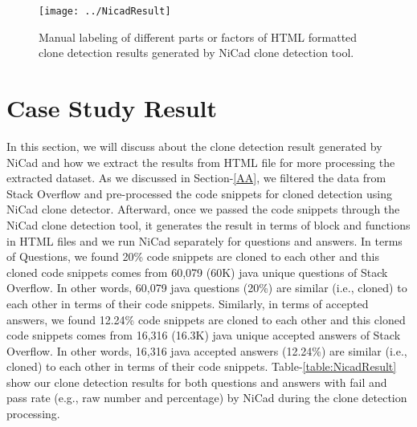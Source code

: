 \documentclass[conference]{IEEEtran}
\begin{document}
	\begin{figure*}[ht]
		\centering
		\texttt{[image: ../NicadResult]}
		\caption{Manual labeling of different parts or factors of HTML formatted clone detection results generated by NiCad clone detection tool. }
		\label{fig:nicadCloningresult}
	\end{figure*}
	
	\section{Case Study Result }\label{CDPR}
	 In this section, we will discuss about the clone detection result generated by NiCad and how we extract the results from HTML file for more processing the extracted dataset.  As we discussed in Section-\ref{AA}, we filtered the data from Stack Overflow and pre-processed the code snippets for cloned detection using NiCad clone detector. Afterward, once we passed the code snippets through the NiCad clone detection tool, it generates the result in terms of block and functions in HTML files and we run NiCad separately for questions and answers. In terms of Questions, we found 20\% code snippets are cloned to each other and this cloned code snippets comes from 60,079 (60K) java unique questions of Stack Overflow. In other words, 60,079 java questions (20\%)  are similar (i.e., cloned) to each other in terms of their code snippets. Similarly, in terms of accepted answers, we found 12.24\% code snippets are cloned to each other and this cloned code snippets comes from 16,316 (16.3K)  java unique accepted answers of Stack Overflow. In other words, 16,316  java accepted answers (12.24\%)  are similar (i.e., cloned) to each other in terms of their code snippets. Table-\ref{table:NicadResult} show our clone detection results for both questions and answers with fail and pass rate (e.g., raw number and percentage) by NiCad during the clone detection processing.
	
\end{document}
